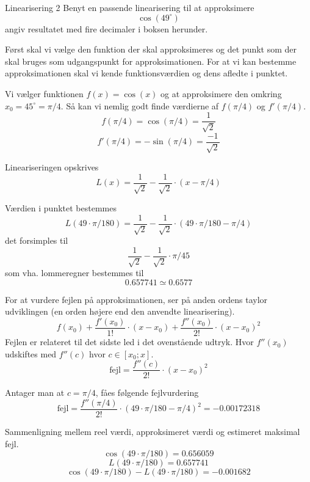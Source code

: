 \documentclass{article}
\begin{document}
\begin{exercise}{Linearisering 2}
Benyt en passende linearisering til at approksimere
\[
\cos(49^\circ)
\]
angiv resultatet med fire decimaler i boksen herunder.

\hint
Først skal vi vælge den funktion der skal approksimeres
og det punkt som der skal bruges som udgangspunkt for
approksimationen.
For at vi kan bestemme approksimationen skal vi
kende funktionsværdien og dens afledte i punktet.

\hint
Vi vælger funktionen $f(x) = \cos(x)$ og at approksimere den
omkring $x_0 = 45^\circ = \pi / 4$.
Så kan vi nemlig godt finde værdierne af $f(\pi / 4)$ og $f'(\pi / 4)$.
\[
f(\pi / 4) = \cos(\pi / 4) = \frac{1}{\sqrt{2}}
\]
\[
f'(\pi / 4) = - \sin(\pi / 4) = \frac{-1}{\sqrt{2}}
\]

\hint
Lineariseringen opskrives
\[
L(x) = \frac{1}{\sqrt{2}} - \frac{1}{\sqrt{2}} \cdot (x - \pi / 4)
\]

\hint
Værdien i punktet bestemmes
\[
L(49 \cdot \pi / 180) = \frac{1}{\sqrt{2}} - \frac{1}{\sqrt{2}} \cdot (49 \cdot \pi / 180 - \pi / 4)
\]
det forsimples til
\[
\frac{1}{\sqrt{2}} - \frac{1}{\sqrt{2}} \cdot \pi / 45
\]
som vha. lommeregner bestemmes til
\[
0.657741 \simeq 0.6577
\]

\hint
For at vurdere fejlen på approksimationen, ser på anden
ordens taylor udviklingen (en orden højere end den
anvendte linearisering).
\[
f(x_0)
+ \frac{f'(x_0)}{1!} \cdot (x - x_0)
+ \frac{f''(x_0)}{2!} \cdot (x - x_0)^2
\]
Fejlen er relateret til det sidste led i det ovenstående udtryk.
Hvor $f''(x_0)$ udskiftes med $f''(c)$ hvor $c \in [x_0; x]$.
\[
\textrm{fejl} = \frac{f''(c)}{2!} \cdot (x - x_0)^2
\]

\hint
Antager man at $c = \pi/4$, fåes følgende fejlvurdering
\[
\textrm{fejl} = \frac{f''(\pi/4)}{2!} \cdot (49 \cdot \pi / 180 - \pi / 4)^2 =
-0.00172318\]

\hint
Sammenligning mellem reel værdi, approksimeret værdi og estimeret maksimal fejl.
\[
\cos(49 \cdot \pi/180) = 0.656059
\]
\[
L(49 \cdot \pi/180) = 0.657741
\]
\[
\cos(49 \cdot \pi/180) - L(49 \cdot \pi/180) = -0.001682
\]

\end{exercise}
\end{document}
